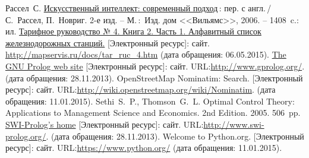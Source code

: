 \documentclass[a4paper,14pt, openany, twoside, final]{extbook} %
\def\emphbib#1{#1}
\begin{document}
\begin{thebibliography}{99}
 Рассел~С. \href{http://www.aiportal.ru/downloads/books/ai-modern-approach-2-edition-by-rassel-norvig.html}{Искусственный интеллект: современный подход}\,{}: пер. с англ.\,{}/ С.~Рассел, П.~Новриг. 2-е изд. -- М.\,:~Изд. дом <<Вильямс>>, 2006. -- 1408~c.: ил.
 \href{http://mapservis.ru/docs/tar_ruc_4.htm}{Тарифное руководство № 4. Книга 2. Часть 1. Алфавитный список железнодорожных станций.} [Электронный ресурс]: сайт. \url{http://mapservis.ru/docs/tar_ruc_4.htm} (дата обращения: 06.05.2015).
 \emphbib{\href{http://www.gprolog.org/}{The GNU Prolog web site} [Электронный ресурс]: сайт}. URL:\url{http://www.gprolog.org/}. (дата обращения: 28.11.2013).
 OpenStreetMap Nominatim: Search.  [Электронный ресурс]: сайт. URL:\url{http://wiki.openstreetmap.org/wiki/Nominatim}. (дата обращения: 11.01.2015).
Sethi~S.~P., Thomson~G.~L. Optimal Control Theory: Applications to Management Science and Economics. 2nd Edition. 2005. 506~pp.
 \emphbib{\href{http://www.swi-prolog.org/}{SWI-Prolog's home} [Электронный ресурс]: сайт}. URL:\url{http://www.swi-prolog.org/}. (дата обращения: 28.11.2013).
 Welcome to Python.org.  [Электронный ресурс]: сайт. URL:\url{https://www.python.org/} (дата обращения: 11.01.2015).
\end{thebibliography}
\newpage
\label{lastpage}
\thispagestyle{empty}
\mbox{}

\vfill\vfill\vfill\vfill
\end{document}
